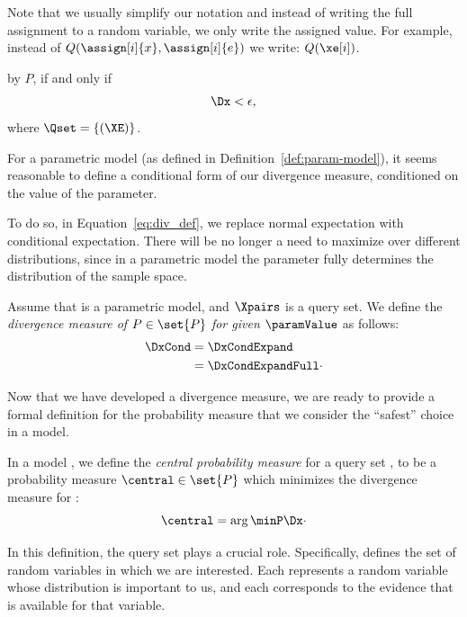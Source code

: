 Note that we usually simplify our notation and instead of writing the full assignment to a random variable, we only
write the assigned value.
For example, instead of $Q(\assign[i]{x} , \assign[i]{e})$ we write: $Q(\xe[i])$.

\begin{proposition}
    \XIE \econverges by $P$, if and only if \[\Dx < \epsilon,\] where $\Qset = \{(\XE)\}$.
\end{proposition}

For a parametric model (as defined in Definition~\ref{def:param-model}), it seems reasonable to define a conditional
form of our divergence measure, conditioned on the value of the parameter.

To do so, in Equation~\ref{eq:div_def}, we replace normal expectation with conditional expectation.
There will be no longer a need to maximize over different distributions, since in a parametric model the parameter
fully determines the distribution of the sample space.

\begin{definition}
    \label{def:cond_divergence}
    Assume that \pmodel is a parametric model, and $\Xpairs$ is a query set.
    We define the \emph{divergence measure of $P \in \set{P}$ for \Qset given $\paramValue$} as follows:
    \begin{align}
        \DxCond &= \DxCondExpand \\
        &= \DxCondExpandFull \cdot
        \label{eq:cond_div_measure}
    \end{align}
\end{definition}

Now that we have developed a divergence measure, we are ready to provide a formal definition for the probability
measure that we consider the ``safest'' choice in a model.

\begin{definition}
    In a model \model, we define the \emph{central probability measure} for a query set \Qset, to be a probability
    measure $\central \in \set{P}$ which minimizes the divergence measure for \Qset:
    \begin{equation*}
        \central = \arg\minP \Dx\cdot
        \label{eq:center}
    \end{equation*}
\end{definition}

In this definition, the query set \Qset plays a crucial role.
Specifically, \Qset defines the set of random variables in which we are interested.
Each \X[i] represents a random variable whose distribution is important to us, and each \E[i] corresponds to the
evidence that is available for that variable.

